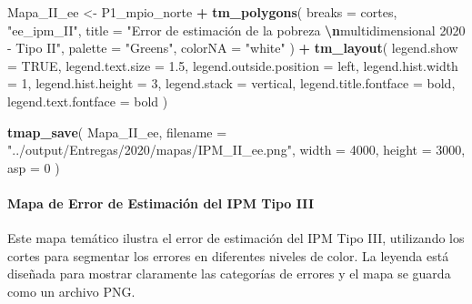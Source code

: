 \documentclass[
  12pt,
]{book}
\newenvironment{Shaded}{\begin{snugshade}}{\end{snugshade}}
\newcommand{\AttributeTok}[1]{\textcolor[rgb]{0.13,0.29,0.53}{#1}}
\newcommand{\ConstantTok}[1]{\textcolor[rgb]{0.56,0.35,0.01}{#1}}
\newcommand{\DecValTok}[1]{\textcolor[rgb]{0.00,0.00,0.81}{#1}}
\newcommand{\FloatTok}[1]{\textcolor[rgb]{0.00,0.00,0.81}{#1}}
\newcommand{\FunctionTok}[1]{\textcolor[rgb]{0.13,0.29,0.53}{\textbf{#1}}}
\newcommand{\NormalTok}[1]{#1}
\newcommand{\OtherTok}[1]{\textcolor[rgb]{0.56,0.35,0.01}{#1}}
\newcommand{\SpecialCharTok}[1]{\textcolor[rgb]{0.81,0.36,0.00}{\textbf{#1}}}
\newcommand{\StringTok}[1]{\textcolor[rgb]{0.31,0.60,0.02}{#1}}
\begin{document}
\begin{Shaded}
\begin{Highlighting}[]
\NormalTok{Mapa\_II\_ee }\OtherTok{\textless{}{-}}
\NormalTok{  P1\_mpio\_norte }\SpecialCharTok{+} \FunctionTok{tm\_polygons}\NormalTok{(}
    \AttributeTok{breaks =}\NormalTok{ cortes,}
    \StringTok{"ee\_ipm\_II"}\NormalTok{,}
    \AttributeTok{title =} \StringTok{"Error de estimación de la pobreza }\SpecialCharTok{\textbackslash{}n}\StringTok{multidimensional 2020 {-} Tipo II"}\NormalTok{,}
    \AttributeTok{palette =} \StringTok{"Greens"}\NormalTok{,}
    \AttributeTok{colorNA =} \StringTok{"white"}
\NormalTok{  ) }\SpecialCharTok{+} \FunctionTok{tm\_layout}\NormalTok{(}
    \AttributeTok{legend.show =} \ConstantTok{TRUE}\NormalTok{,}
    \AttributeTok{legend.text.size =} \FloatTok{1.5}\NormalTok{,}
    \AttributeTok{legend.outside.position =} \StringTok{\textquotesingle{}left\textquotesingle{}}\NormalTok{,}
    \AttributeTok{legend.hist.width =} \DecValTok{1}\NormalTok{,}
    \AttributeTok{legend.hist.height =} \DecValTok{3}\NormalTok{,}
    \AttributeTok{legend.stack =} \StringTok{\textquotesingle{}vertical\textquotesingle{}}\NormalTok{,}
    \AttributeTok{legend.title.fontface =} \StringTok{\textquotesingle{}bold\textquotesingle{}}\NormalTok{,}
    \AttributeTok{legend.text.fontface =} \StringTok{\textquotesingle{}bold\textquotesingle{}}
\NormalTok{  )}

\FunctionTok{tmap\_save}\NormalTok{(}
\NormalTok{  Mapa\_II\_ee,}
  \AttributeTok{filename =} \StringTok{"../output/Entregas/2020/mapas/IPM\_II\_ee.png"}\NormalTok{,}
  \AttributeTok{width =} \DecValTok{4000}\NormalTok{,}
  \AttributeTok{height =} \DecValTok{3000}\NormalTok{,}
  \AttributeTok{asp =} \DecValTok{0}
\NormalTok{)}
\end{Highlighting}
\end{Shaded}

\hypertarget{mapa-de-error-de-estimaciuxf3n-del-ipm-tipo-iii}{%
\paragraph*{Mapa de Error de Estimación del IPM Tipo III}\label{mapa-de-error-de-estimaciuxf3n-del-ipm-tipo-iii}}

Este mapa temático ilustra el error de estimación del IPM Tipo III, utilizando los cortes para segmentar los errores en diferentes niveles de color. La leyenda está diseñada para mostrar claramente las categorías de errores y el mapa se guarda como un archivo PNG.
\end{document}
